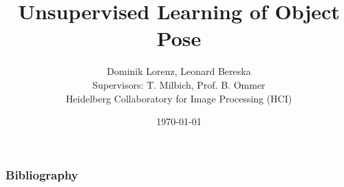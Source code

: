 \documentclass[xcolor=dvipsnames]{beamer}
\title{{Unsupervised Learning of Object Pose}}
\author{Dominik Lorenz, Leonard Bereska  \\
Supervisors: T. Milbich, Prof. B. Ommer \\
Heidelberg Collaboratory for Image Processing (HCI)}
\date{\today}
\begin{document}


\begin{frame}
	\frametitle{Bibliography}
{}

\end{frame}
\end{document}
